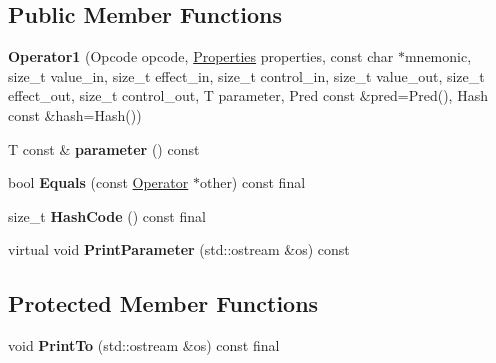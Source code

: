 \subsection*{Public Member Functions}
\begin{DoxyCompactItemize}
\item 
{\bfseries Operator1} (Opcode opcode, \hyperlink{classv8_1_1base_1_1_flags}{Properties} properties, const char $\ast$mnemonic, size\+\_\+t value\+\_\+in, size\+\_\+t effect\+\_\+in, size\+\_\+t control\+\_\+in, size\+\_\+t value\+\_\+out, size\+\_\+t effect\+\_\+out, size\+\_\+t control\+\_\+out, T parameter, Pred const \&pred=Pred(), Hash const \&hash=Hash())\hypertarget{classv8_1_1internal_1_1compiler_1_1_operator1_aafab80cb37b87170d3cdedf011fe3869}{}\label{classv8_1_1internal_1_1compiler_1_1_operator1_aafab80cb37b87170d3cdedf011fe3869}

\item 
T const \& {\bfseries parameter} () const \hypertarget{classv8_1_1internal_1_1compiler_1_1_operator1_aacce99a680b2b6fcccfd03161d086857}{}\label{classv8_1_1internal_1_1compiler_1_1_operator1_aacce99a680b2b6fcccfd03161d086857}

\item 
bool {\bfseries Equals} (const \hyperlink{classv8_1_1internal_1_1compiler_1_1_operator}{Operator} $\ast$other) const  final\hypertarget{classv8_1_1internal_1_1compiler_1_1_operator1_ab374259f794adc5e20a28898d857025f}{}\label{classv8_1_1internal_1_1compiler_1_1_operator1_ab374259f794adc5e20a28898d857025f}

\item 
size\+\_\+t {\bfseries Hash\+Code} () const  final\hypertarget{classv8_1_1internal_1_1compiler_1_1_operator1_ab09112ec3fc445d9ad3cc71da0abdb77}{}\label{classv8_1_1internal_1_1compiler_1_1_operator1_ab09112ec3fc445d9ad3cc71da0abdb77}

\item 
virtual void {\bfseries Print\+Parameter} (std\+::ostream \&os) const \hypertarget{classv8_1_1internal_1_1compiler_1_1_operator1_a0632bc30741895d2c3479237b49776f2}{}\label{classv8_1_1internal_1_1compiler_1_1_operator1_a0632bc30741895d2c3479237b49776f2}

\end{DoxyCompactItemize}
\subsection*{Protected Member Functions}
\begin{DoxyCompactItemize}
\item 
void {\bfseries Print\+To} (std\+::ostream \&os) const  final\hypertarget{classv8_1_1internal_1_1compiler_1_1_operator1_abafc0b050faf7856fb719c626e4303b2}{}\label{classv8_1_1internal_1_1compiler_1_1_operator1_abafc0b050faf7856fb719c626e4303b2}

\end{DoxyCompactItemize}
